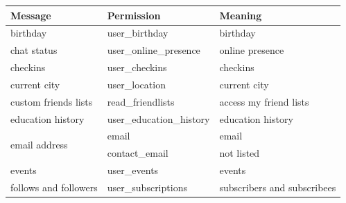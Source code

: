 \documentclass[10pt]{sig-alternate-10pt}
\begin{document}
\begin{subtables}
\begin{table}[htbp]
  \centering
  \begin{tabular}{|l|l|l|}
    \hline

    \textbf{Message}                      & \textbf{Permission}         & \textbf{Meaning} \cite{fbpermissions}                                                                            \\ \hline\hline
    birthday                              & user\_birthday              & birthday                                                                                    \\ \hline
    chat status                           & user\_online\_presence      & online presence                                                                             \\ \hline
    checkins                              & user\_checkins              & checkins                                                                                    \\ \hline
    current city                          & user\_location              & current city                                                                                \\ \hline
    custom friends lists                  & read\_friendlists           & access my friend lists                                                                      \\ \hline
    education history                     & user\_education\_history    & education history                                                                           \\ \hline
    \multirow{2}{*}{email address}        & email                       & email                                                                                       \\ \cline{2-3} 
    & contact\_email              & not listed                                                                                  \\ \hline
    events                                & user\_events                & events                                                                                      \\ \hline
    follows and followers                 & user\_subscriptions         & subscribers and subscribees                                                                 \\ \hline

\end{tabular}
\end{table}
\end{subtables}
\end{document}
